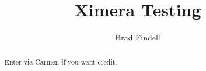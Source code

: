 \documentclass[handout,space,nooutcomes]{xourse}
\title{Ximera Testing}
\author{Brad Findell}
\begin{document}
\begin{abstract}
Enter via Carmen if you want credit.   
\end{abstract}
\maketitle


\end{document}
